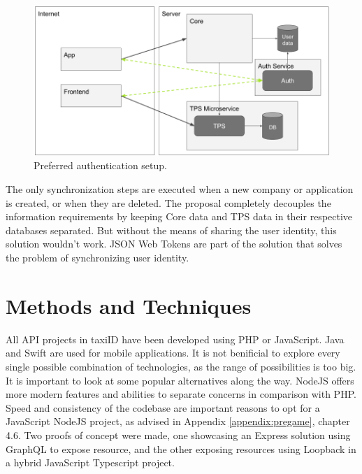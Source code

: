 \begin{figure}[H]
	\centering
	\includegraphics[width=1\textwidth]{Authentication}
	\caption[Authentication]{Preferred authentication setup.}
	\label{fig:Authentication}
\end{figure}

The only synchronization steps are executed when a new company or application is created, or when they are deleted. The proposal completely decouples the information requirements by keeping Core data and TPS data in their respective databases separated. But without the means of sharing the user identity, this solution wouldn't work. JSON Web Tokens are part of the solution that solves the problem of synchronizing user identity.

%
\section{Methods and Techniques}
All API projects in taxiID have been developed using PHP or JavaScript. Java and Swift are used for mobile applications. It is not benificial to explore every single possible combination of technologies, as the range of possibilities is too big. It is important to look at some popular alternatives along the way. NodeJS offers more modern features and abilities to separate concerns in comparison with PHP. Speed and consistency of the codebase are important reasons to opt for a JavaScript NodeJS project, as advised in Appendix \ref{appendix:pregame}, chapter 4.6. Two proofs of concept were made, one showcasing an Express solution using GraphQL to expose resource, and the other exposing resources using Loopback in a hybrid JavaScript Typescript project.

